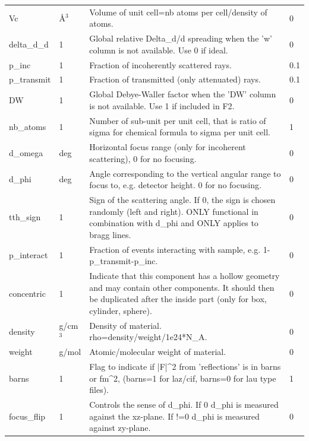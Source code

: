 \begin{longtable}{p{}p{}p{}p{}}
Vc & \AA{}$^{3}$ & Volume of unit cell=nb atoms per cell/density of atoms. & 0 \\
delta\_d\_d & 1 & Global relative Delta\_d/d spreading when the 'w' column is not available. Use 0 if ideal. & 0 \\
p\_inc & 1 & Fraction of incoherently scattered rays. & 0.1 \\
p\_transmit & 1 & Fraction of transmitted (only attenuated) rays. & 0.1 \\
DW & 1 & Global Debye-Waller factor when the 'DW' column is not available. Use 1 if included in F2. & 0 \\
nb\_atoms & 1 & Number of sub-unit per unit cell, that is ratio of sigma for chemical formula to sigma per unit cell. & 1 \\
d\_omega & deg & Horizontal focus range (only for incoherent scattering), 0 for no focusing. & 0 \\
d\_phi & deg & Angle corresponding to the vertical angular range to focus to, e.g. detector height. 0 for no focusing. & 0 \\
tth\_sign & 1 & Sign of the scattering angle. If 0, the sign is chosen randomly (left and right). ONLY functional in combination with d\_phi and ONLY applies to bragg lines. & 0 \\
p\_interact & 1 & Fraction of events interacting with sample, e.g. 1-p\_transmit-p\_inc. & 0 \\
concentric & 1 & Indicate that this component has a hollow geometry and may contain other components. It should then be duplicated after the inside part (only for box, cylinder, sphere). & 0 \\
density & g/cm$^{3}$ & Density of material. rho=density/weight/1e24*N\_A. & 0 \\
weight & g/mol & Atomic/molecular weight of material. & 0 \\
barns & 1 & Flag to indicate if |F|\textasciicircum{}2 from 'reflections' is in barns or fm\textasciicircum{}2, (barns=1 for laz/cif, barns=0 for lau type files). & 1 \\
focus\_flip & 1 & Controls the sense of d\_phi. If 0 d\_phi is measured against the xz-plane. If !=0 d\_phi is measured against zy-plane. & 0 \\
\bottomrule
\end{longtable}

